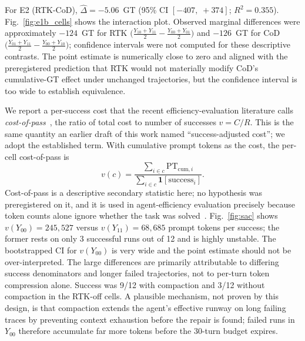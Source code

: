 \documentclass{article}
\begin{document}
For E2 (RTK-CoD), $\hat{\Delta}=-5.06$~GT (95\% CI $[-407,\;+374]$; $R^2=0.355$). Fig.~\ref{fig:e1b_cells} shows the interaction plot. Observed marginal differences were approximately $-124$~GT for RTK $\bigl(\tfrac{Y_{10}+Y_{11}}{2} - \tfrac{Y_{00}+Y_{01}}{2}\bigr)$ and $-126$~GT for CoD $\bigl(\tfrac{Y_{01}+Y_{11}}{2} - \tfrac{Y_{00}+Y_{10}}{2}\bigr)$; confidence intervals were not computed for these descriptive contrasts. The point estimate is numerically close to zero and aligned with the preregistered prediction that RTK would not materially modify CoD's cumulative-GT effect under unchanged trajectories, but the confidence interval is too wide to establish equivalence.

We report a per-success cost that the recent efficiency-evaluation literature calls \emph{cost-of-pass}~\citep{costofpass2025}, the ratio of total cost to number of successes $v=C/R$. This is the same quantity an earlier draft of this work named ``success-adjusted cost''; we adopt the established term. With cumulative prompt tokens as the cost, the per-cell cost-of-pass is
\begin{equation}
  v(c)
  = \frac{\displaystyle\sum_{i \in c} \mathrm{PT}_{\mathrm{cum},i}}{\displaystyle\sum_{i \in c} \mathbf{1}[\mathrm{success}_i]}.
  \label{eq:sac}
\end{equation}
Cost-of-pass is a descriptive secondary statistic here; no hypothesis was preregistered on it, and it is used in agent-efficiency evaluation precisely because token counts alone ignore whether the task was solved~\citep{costofpass2025, aiagentsmatter2024, efficientagents2025}. Fig.~\ref{fig:sac} shows $v(Y_{00})=245{,}527$ versus $v(Y_{11})=68{,}685$ prompt tokens per success; the former rests on only 3 successful runs out of 12 and is highly unstable. The bootstrapped CI for $v(Y_{00})$ is very wide and the point estimate should not be over-interpreted. The large differences are primarily attributable to differing success denominators and longer failed trajectories, not to per-turn token compression alone. Success was 9/12 with compaction and 3/12 without compaction in the RTK-off cells. A plausible mechanism, not proven by this design, is that compaction extends the agent's effective runway on long failing traces by preventing context exhaustion before the repair is found; failed runs in $Y_{00}$ therefore accumulate far more tokens before the 30-turn budget expires.
\end{document}
